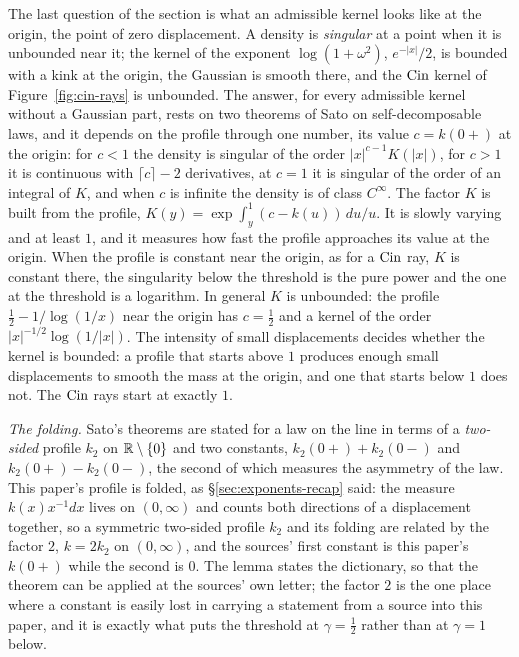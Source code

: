 The last question of the section is what an admissible kernel looks like at the origin, the
point of zero displacement. A density is \emph{singular} at a point when it is
unbounded near it; the kernel of the exponent $\log(1+\omega^2)$, $e^{-|x|}/2$, is bounded with a
kink at the origin, the Gaussian is smooth there, and the $\operatorname{Cin}$ kernel of
Figure~\ref{fig:cin-rays} is unbounded. The answer, for every admissible kernel without a
Gaussian part, rests on two theorems of Sato on self-decomposable laws, and it depends on the profile
through one number, its value $c = k(0{+})$ at the origin: for $c < 1$ the density is
singular of the order $|x|^{c-1}K(|x|)$, for $c > 1$ it is continuous with
$\lceil c\rceil - 2$ derivatives, at $c = 1$ it is singular of the order of an integral of
$K$, and when $c$ is infinite the density is of class $C^\infty$. The factor $K$ is built from the profile, $K(y) = \exp\int_y^1 (c - k(u))\,du/u$. It is
slowly varying and at least $1$, and it measures how fast the profile approaches its value at
the origin. When the profile is constant near the origin, as for a $\operatorname{Cin}$ ray, $K$ is constant
there, the singularity below the threshold is the pure power and the one at the threshold is
a logarithm. In general $K$ is unbounded: the profile $\tfrac12 - 1/\log(1/x)$ near the origin
has $c = \tfrac12$ and a kernel of the order $|x|^{-1/2}\log(1/|x|)$. The intensity of small
displacements decides whether the kernel is bounded: a profile that starts
above $1$ produces enough small displacements to smooth the mass at the origin, and one that
starts below $1$ does not. The $\operatorname{Cin}$ rays start at exactly $1$.

\emph{The folding.} Sato's theorems are stated for a law on the line in terms of a
\emph{two-sided} profile $k_2$ on $\mathbb{R} \setminus \{0\}$ and two constants,
$k_2(0{+}) + k_2(0{-})$ and $k_2(0{+}) - k_2(0{-})$, the second of which measures the
asymmetry of the law. This paper's profile is folded, as \S\ref{sec:exponents-recap} said:
the \Levy{} measure $k(x)x^{-1}dx$ lives on $(0,\infty)$ and counts both directions of a
displacement together, so a symmetric two-sided profile $k_2$ and its folding are related by
the factor $2$, $k = 2 k_2$ on $(0,\infty)$, and the sources' first constant is this paper's
$k(0{+})$ while the second is $0$. The lemma states the dictionary, so that the theorem can be
applied at the sources' own letter; the factor $2$ is the one place where a constant is easily
lost in carrying a statement from a source into this paper, and it is exactly what puts the
\Matern{} threshold at $\gamma = \tfrac12$ rather than at $\gamma = 1$ below.

